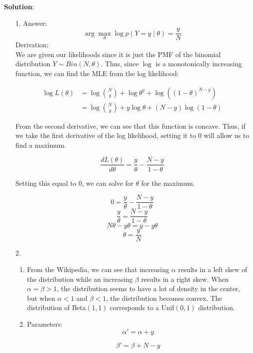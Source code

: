 \documentclass[submit]{../harvardml}
\newenvironment{answer}{
    \vspace{2mm}
    \color{blue}\noindent\textbf{Solution}:
}{}
\begin{document}
\begin{answer}
  \begin{enumerate}
    \item[1.]
      Answer:
      \[
        \arg \max_{\theta} \log p(Y = y \mid \theta) = \frac{y}{N}
      \]
      Derivation:\\

      We are given our likelihoods since it is just the PMF of the binomial distribution $Y \sim Bin(N, \theta)$. Thus, since $\log$ is a monotonically increasing function, we can find the MLE from the log likelihood:

    \begin{align*}
        \log L(\theta) &= \log \binom{N}{y} + \log \theta^{y} + \log ((1-\theta)^{N-y}) \\
        &= \log\binom{N}{y} + y\log \theta + (N-y) \log(1-\theta)
    \end{align*}

    From the second derivative, we can see that this function is concave. Thus, if we take the first derivative of the log likelihood, setting it to 0 will allow us to find a maximum.

    \[
    \frac{dL(\theta)}{d\theta} = \frac{y}{\theta} - \frac{N-y}{1-\theta}
    \]

    Setting this equal to 0, we can solve for $\theta$ for the maximum.

    \[
    0 = \frac{y}{\theta} - \frac{N-y}{1-\theta}
    \]
    \[
    \frac{y}{\theta} =\frac{N-y}{1-\theta}
    \]
    \[
    N\theta - y\theta = y - y\theta
    \]
    \[
    \theta = \frac{y}{N}
    \]

    \item[2.]
      \begin{enumerate}
        \item
        From the Wikipedia, we can see that increasing $\alpha$ results in a left skew of the distribution while an increasing $\beta$ results in a right skew. When $\alpha = \beta > 1$, the distribution seems to have a lot of density in the center, but when $\alpha < 1$ and $\beta < 1$, the distribution becomes convex. The distribution of Beta$(1, 1)$ corresponds to a Unif$(0,1)$ distribution.

        \item

              Parameters:
              \[
                \alpha' = \alpha + y
              \]

              \[
                \beta' = \beta + N - y
              \]


\end{enumerate}
\end{enumerate}
\end{answer}
\end{document}
